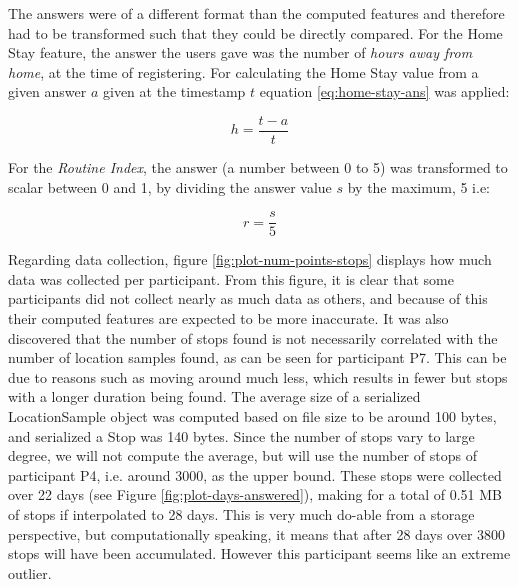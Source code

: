 The answers were of a different format than the computed features and therefore had to be transformed such that they could be directly compared. For the Home Stay feature, the answer the users gave was the number of \textit{hours away from home}, at the time of registering. For calculating the Home Stay value from a given answer $a$ given at the timestamp $t$ equation \ref{eq:home-stay-ans} was applied:

\begin{equation}
\label{eq:home-stay-ans}
    h = \frac{t - a }{t}
\end{equation}

For the \textit{Routine Index}, the answer (a number between 0 to 5) was transformed to scalar between 0 and 1, by dividing the answer value $s$ by the maximum, 5 i.e:

\begin{equation}
\label{eq:routine-ans}
    r = \frac{s}{5}
\end{equation}

Regarding data collection, figure \ref{fig:plot-num-points-stops} displays how much data was collected per participant. From this figure, it is clear that some participants did not collect nearly as much data as others, and because of this their computed features are expected to be more inaccurate. It was also discovered that the number of stops found is not necessarily correlated with the number of location samples found, as can be seen for participant P7. This can be due to reasons such as moving around much less, which results in fewer but stops with a longer duration being found. The average size of a serialized LocationSample object was computed based on file size to be around 100 bytes, and serialized a Stop was 140 bytes. Since the number of stops vary to large degree, we will not compute the average, but will use the number of stops of participant P4, i.e. around 3000, as the upper bound. These stops were collected over 22 days (see Figure \ref{fig:plot-days-answered}), making for a total of 0.51 MB of stops if interpolated to 28 days. This is very much do-able from a storage perspective, but computationally speaking, it means that after 28 days over 3800 stops will have been accumulated. However this participant seems like an extreme outlier.\\

